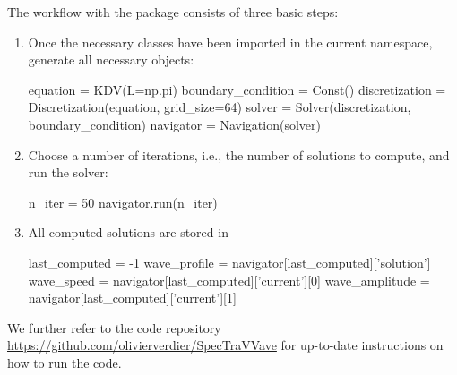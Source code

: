 The workflow with the package consists of three basic steps:
\begin{enumerate}
\item Once the necessary classes have been imported in the current namespace, generate all necessary objects:
\begin{python}
equation = KDV(L=np.pi)
boundary_condition = Const()
discretization = Discretization(equation, grid_size=64)
solver = Solver(discretization, boundary_condition)
navigator = Navigation(solver)    
\end{python}
\item Choose a number of iterations, i.e., the number of solutions to compute, and run the solver:
\begin{python}
n_iter = 50
navigator.run(n_iter)
\end{python}
\item All computed solutions are stored in 
\begin{python}
last_computed = -1    
wave_profile = navigator[last_computed]['solution']
wave_speed = navigator[last_computed]['current'][0]
wave_amplitude = navigator[last_computed]['current'][1]
\end{python}
\end{enumerate} 

We further refer to the code repository \url{https://github.com/olivierverdier/SpecTraVVave} for up-to-date instructions on how to run the code.







%




